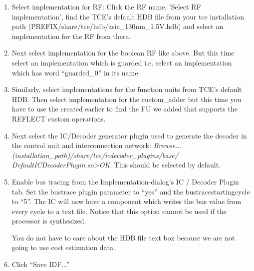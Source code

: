 \documentclass[twoside]{tceusermanual}
\begin{document}
\begin{enumerate}
\item%
Select implementation for RF: Click the RF name, 'Select RF implementation',
find the TCE's default HDB file from your tce installation path 
(PREFIX/share/tce/hdb/asic\_130nm\_1.5V.hdb) and select an
implementation for the RF from there.

\item%
Next select implementation for the boolean RF like above. But this time
select an implementation which is guarded i.e. select an implementation which
has word ``guarded\_0'' in its name.

\item%
Similarly, select implementations for the function units from TCE's default
HDB. Then select implementation for the custom\_adder but this time you have to
use the  created earlier to find the FU we added that supports the
REFLECT custom operations.

\item%
Next select the IC/Decoder generator plugin used to generate the
decoder in the control unit and interconnection network:
\textit{Browse... (installation\_path)/share/tce/icdecoder\_plugins/base/
DefaultICDecoderPlugin.so>OK}. This should be selected by default.

\item%
Enable bus tracing from the Implementation-dialog's IC / Decoder Plugin tab.
Set the bustrace plugin parameter to ``yes'' and the bustracestartingcycle to
``5''. The IC will now have a component which writes the bus value from every
cycle to a text file. Notice that this option cannot be used if the processor
is synthesized.

You do not have to care about the HDB file text box because we are not going 
to use cost estimation data.

\item%
Click ``Save IDF...''
\end{enumerate}



%
%
%
\end{document}
